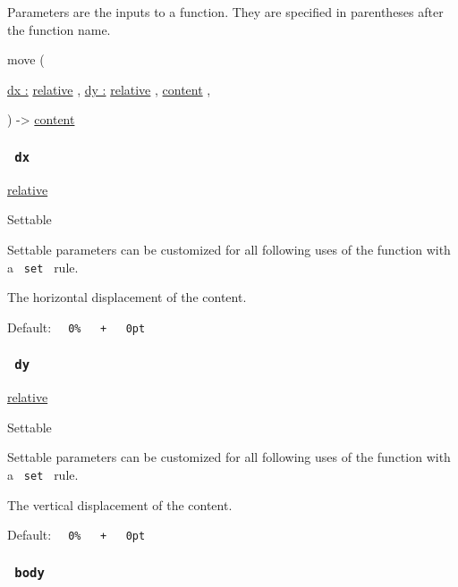 \label{parameters-tooltip}
Parameters are the inputs to a function. They are specified in
parentheses after the function name.

{ move } (

{ \hyperref[parameters-dx]{dx :}
\href{/docs/reference/layout/relative/}{relative} , } {
\hyperref[parameters-dy]{dy :}
\href{/docs/reference/layout/relative/}{relative} , } {
\href{/docs/reference/foundations/content/}{content} , }

) -\textgreater{} \href{/docs/reference/foundations/content/}{content}

\subsubsection{\texorpdfstring{\texttt{\ dx\ }}{ dx }}\label{parameters-dx}

\href{/docs/reference/layout/relative/}{relative}

{{ Settable }}

\label{parameters-dx-settable-tooltip}
Settable parameters can be customized for all following uses of the
function with a \texttt{\ set\ } rule.

The horizontal displacement of the content.

Default:
\texttt{\ }{\texttt{\ 0\%\ }}\texttt{\ }{\texttt{\ +\ }}\texttt{\ }{\texttt{\ 0pt\ }}\texttt{\ }

\subsubsection{\texorpdfstring{\texttt{\ dy\ }}{ dy }}\label{parameters-dy}

\href{/docs/reference/layout/relative/}{relative}

{{ Settable }}

\label{parameters-dy-settable-tooltip}
Settable parameters can be customized for all following uses of the
function with a \texttt{\ set\ } rule.

The vertical displacement of the content.

Default:
\texttt{\ }{\texttt{\ 0\%\ }}\texttt{\ }{\texttt{\ +\ }}\texttt{\ }{\texttt{\ 0pt\ }}\texttt{\ }

\subsubsection{\texorpdfstring{\texttt{\ body\ }}{ body }}\label{parameters-body}

